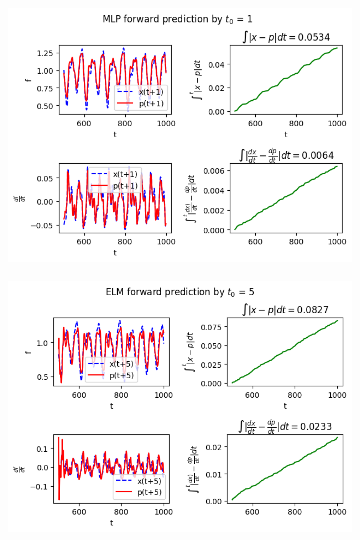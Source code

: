 \documentclass[11pt]{article}
\begin{document}
 \begin{figure}[t]
   \begin{center}
    \begin{subfigure}{0.48\textwidth}
      \includegraphics[width=\textwidth]{figures/MLP_1.png}
      \caption{}
      \label{fig:mg2_func_MLP}
    \end{subfigure}
    \begin{subfigure}{0.48\textwidth}
      \includegraphics[width=\textwidth]{figures/ELM_5.png}
      \caption{}
    \end{subfigure}
      \begin{subfigure}{0.48\textwidth}

\end{subfigure}
\end{center}
\end{figure}
\end{document}

